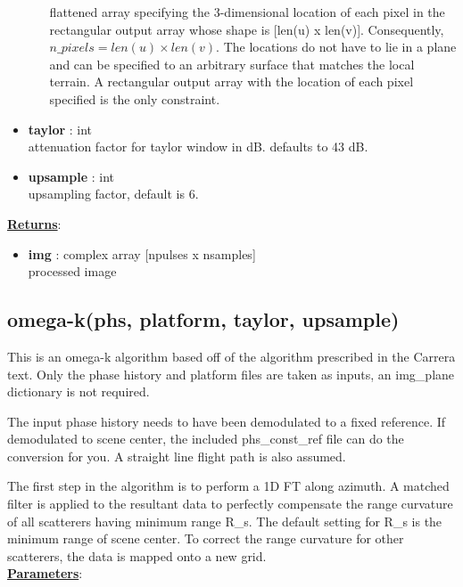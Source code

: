 \documentclass{article}
\newcommand{\defs}[2]{\textbf{{#1}} : {#2}}
\begin{document}
\begin{itemize}
\begin{itemize}
	    	flattened array specifying the 3-dimensional location of each pixel in the rectangular output array whose shape is [len(u) x len(v)].  Consequently, $n\_pixels = len(u) \times len(v)$.  The locations do not have to lie in a plane and can be specified to an arbitrary surface that matches the local terrain.  A rectangular output array with the location of each pixel specified is the only constraint.
	\end{itemize}
	\item\defs{taylor}{int}\\
	attenuation factor for taylor window in dB.  defaults to 43 dB.
	\item\defs{upsample}{int}\\
	upsampling factor, default is 6.
\end{itemize}

\noindent \underline{\textbf{Returns}}:
\begin{itemize}
	\item \defs{img}{complex array [npulses x nsamples]}\\
	processed image
\end{itemize}

\subsection{omega-k(phs, platform, taylor, upsample)}
This is an omega-k algorithm based off of the algorithm prescribed in the Carrera text.  Only the phase history and platform files are taken as inputs, an img\_plane dictionary is not required. 

The input phase history needs to have been demodulated to a fixed reference.  If demodulated to scene center, the included phs\_const\_ref file can do the conversion for you.  A straight line flight path is also assumed.

The first step in the algorithm is to perform a 1D FT along azimuth.  A matched filter is applied to the resultant data to perfectly compensate the range curvature of all scatterers having minimum range R\_s.  The default setting for R\_s is the minimum range of scene center.  To correct the range curvature for other scatterers, the data is mapped onto a new grid.\\

\noindent \underline{\textbf{Parameters}}:
\end{document}
